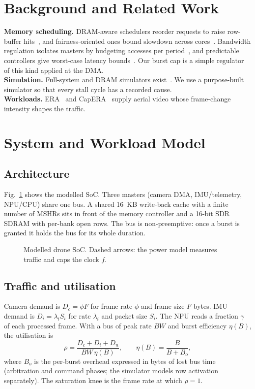 \documentclass[conference]{IEEEtran}
\begin{document}
\section{Background and Related Work}
\textbf{Memory scheduling.} DRAM-aware schedulers reorder requests to raise row-buffer hits~\cite{rixner2000}, and fairness-oriented ones bound slowdown across cores~\cite{mutlu2007,kim2010atlas}. Bandwidth regulation isolates masters by budgeting accesses per period~\cite{yun2013memguard}, and predictable controllers give worst-case latency bounds~\cite{akesson2007predator}. Our burst cap is a simple regulator of this kind applied at the DMA.\\
\textbf{Simulation.} Full-system and DRAM simulators exist~\cite{binkert2011gem5,kim2016ramulator}. We use a purpose-built simulator so that every stall cycle has a recorded cause.\\
\textbf{Workloads.} ERA~\cite{mou2020era} and CapERA~\cite{bashmal2023capera} supply aerial video whose frame-change intensity shapes the traffic.

\section{System and Workload Model}
\subsection{Architecture}
Fig.~\ref{fig:arch} shows the modelled SoC. Three masters (camera DMA, IMU/telemetry, NPU/CPU) share one bus. A shared 16~KB write-back cache with a finite number of MSHRs sits in front of the memory controller and a 16-bit SDR SDRAM with per-bank open rows. The bus is non-preemptive: once a burst is granted it holds the bus for its whole duration.
\begin{figure}[t]\centering\caption{Modelled drone SoC. Dashed arrows: the power model measures traffic and caps the clock $f$.}\label{fig:arch}\end{figure}

\subsection{Traffic and utilisation}
Camera demand is $D_c=\phi F$ for frame rate $\phi$ and frame size $F$ bytes. IMU demand is $D_i=\lambda_i S_i$ for rate $\lambda_i$ and packet size $S_i$. The NPU reads a fraction $\gamma$ of each processed frame. With a bus of peak rate $BW$ and burst efficiency $\eta(B)$, the utilisation is
\begin{equation}
\rho=\frac{D_c+D_i+D_n}{BW\,\eta(B)},\qquad \eta(B)=\frac{B}{B+B_o},
\label{eq:rho}
\end{equation}
where $B_o$ is the per-burst overhead expressed in bytes of lost bus time (arbitration and command phases; the simulator models row activation separately). The saturation knee is the frame rate at which $\rho=1$.
\end{document}
